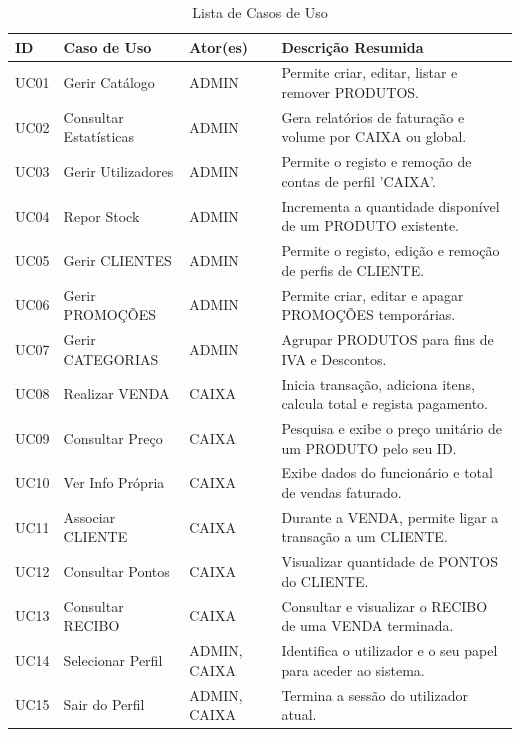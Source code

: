 \documentclass[a4paper]{llncs}
\begin{document}
\begin{table}[H]
    \centering
    \footnotesize
    \setlength{\tabcolsep}{4pt}
    \begin{tabularx}{\textwidth}{lllX}
        \toprule
        \textbf{ID} & \textbf{Caso de Uso} & \textbf{Ator(es)} & \textbf{Descrição Resumida} \\ \midrule
        UC01 & Gerir Catálogo & ADMIN & Permite criar, editar, listar e remover PRODUTOS. \\
        UC02 & Consultar Estatísticas & ADMIN & Gera relatórios de faturação e volume por CAIXA ou global. \\
        UC03 & Gerir Utilizadores & ADMIN & Permite o registo e remoção de contas de perfil 'CAIXA'. \\
        UC04 & Repor Stock & ADMIN & Incrementa a quantidade disponível de um PRODUTO existente. \\
        UC05 & Gerir CLIENTES & ADMIN & Permite o registo, edição e remoção de perfis de CLIENTE. \\
        UC06 & Gerir PROMOÇÕES & ADMIN & Permite criar, editar e apagar PROMOÇÕES temporárias. \\
        UC07 & Gerir CATEGORIAS & ADMIN & Agrupar PRODUTOS para fins de IVA e Descontos. \\
        UC08 & Realizar VENDA & CAIXA & Inicia transação, adiciona itens, calcula total e regista pagamento. \\
        UC09 & Consultar Preço & CAIXA & Pesquisa e exibe o preço unitário de um PRODUTO pelo seu ID. \\
        UC10 & Ver Info Própria & CAIXA & Exibe dados do funcionário e total de vendas faturado. \\
        UC11 & Associar CLIENTE & CAIXA & Durante a VENDA, permite ligar a transação a um CLIENTE. \\
        UC12 & Consultar Pontos & CAIXA & Visualizar quantidade de PONTOS do CLIENTE. \\
        UC13 & Consultar RECIBO & CAIXA & Consultar e visualizar o RECIBO de uma VENDA terminada. \\
        UC14 & Selecionar Perfil & ADMIN, CAIXA & Identifica o utilizador e o seu papel para aceder ao sistema. \\
        UC15 & Sair do Perfil & ADMIN, CAIXA & Termina a sessão do utilizador atual. \\ \bottomrule
    \end{tabularx}
    \caption{Lista de Casos de Uso}
    \label{tab:use_cases}
\end{table}
\end{document}
